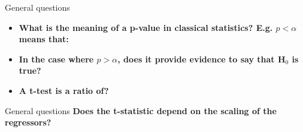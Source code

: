 \documentclass{beamer}
\begin{document}
\begin{frame}{General questions}
  \begin{itemize}
    \item \textbf{What is the meaning of a p-value in classical statistics? E.g. $p < \alpha$ means that:}


    \bigskip
    \item \textbf{In the case where $p > \alpha$, does it provide evidence to say that H$_{0}$ is true?}


    \bigskip
    \item \textbf{A t-test is a ratio of?}

% 
  \end{itemize}
\end{frame}      


\begin{frame}{General questions}
  \textbf{Does the t-statistic depend on the scaling of the regressors?}

% 
% 
\end{frame} 


% 
\end{document}
